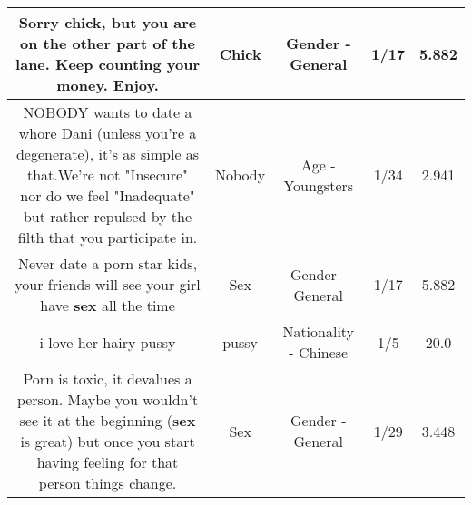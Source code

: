 \documentclass[11pt]{article}
\newlength\mylength
\begin{document}
\begin{center}
\begin{longtable}{|C{.65\mylength}|C{.30\mylength}|C{.12\mylength}|C{.12\mylength}|C{.12\mylength}|}
  \small Sorry \textbf{chick}, but you are on the other part of the lane. Keep counting your money. Enjoy.\normalsize   & Chick & Gender - General & 1/17 & 5.882 \\  \hline
  \small NOBODY wants to date a whore Dani (unless you're a degenerate), it's as simple as that.We're not "Insecure" nor do we feel "Inadequate" but rather repulsed by the filth that you participate in.\normalsize   & Nobody & Age - Youngsters & 1/34 & 2.941 \\  \hline
  \small Never date a porn star kids, your friends will see your girl have \textbf{sex} all the time\normalsize   & Sex & Gender - General & 1/17 & 5.882 \\  \hline
  \small i love her hairy pussy\normalsize   & pussy & Nationality - Chinese & 1/5 & 20.0 \\  \hline
  \small Porn is toxic, it devalues a person. Maybe you wouldn't see it at the beginning (\textbf{sex} is great) but once you start having feeling for that person things change.\normalsize   & Sex & Gender - General & 1/29 & 3.448 \\  \hline

\end{longtable}
\end{center}
\end{document}
